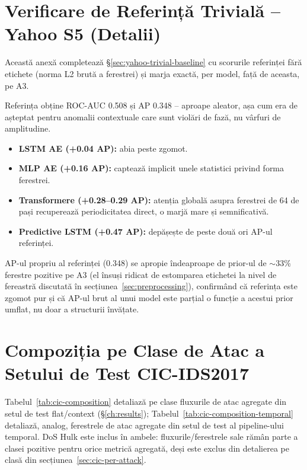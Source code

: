 \chapter{Verificare de Referință Trivială -- Yahoo S5 (Detalii)}
\label{sec:yahoo-trivial-baseline-appendix}

Această anexă completează \S\ref{sec:yahoo-trivial-baseline} cu scorurile referinței fără etichete (norma L2 brută a ferestrei) și marja exactă, per model, față de aceasta, pe A3.

Referința obține ROC-AUC 0.508 și AP 0.348 -- aproape aleator, așa cum era de așteptat pentru anomalii contextuale care sunt violări de fază, nu vârfuri de amplitudine.

\begin{itemize}
  \item \textbf{LSTM AE (+0.04 AP):} abia peste zgomot.
  \item \textbf{MLP AE (+0.16 AP):} captează implicit unele statistici privind forma ferestrei.
  \item \textbf{Transformere (+0.28--0.29 AP):} atenția globală asupra ferestrei de 64 de pași recuperează periodicitatea direct, o marjă mare și semnificativă.
  \item \textbf{Predictive LSTM (+0.47 AP):} depășește de peste două ori AP-ul referinței.
\end{itemize}

AP-ul propriu al referinței (0.348) se apropie îndeaproape de prior-ul de $\sim$33\% ferestre pozitive pe A3 (el însuși ridicat de estomparea etichetei la nivel de fereastră discutată în secțiunea~\ref{sec:preprocessing}), confirmând că referința este zgomot pur și că AP-ul brut al unui model este parțial o funcție a acestui prior umflat, nu doar a structurii învățate.

\chapter{Compoziția pe Clase de Atac a Setului de Test CIC-IDS2017}
\label{ch:cic-composition-temporal}

Tabelul~\ref{tab:cic-composition} detaliază pe clase fluxurile de atac agregate din setul de test flat/context (\S\ref{ch:results}); Tabelul~\ref{tab:cic-composition-temporal} detaliază, analog, ferestrele de atac agregate din setul de test al pipeline-ului temporal. DoS Hulk este inclus în ambele: fluxurile/ferestrele sale rămân parte a clasei pozitive pentru orice metrică agregată, deși este exclus din detalierea pe clasă din secțiunea~\ref{sec:cic-per-attack}.

